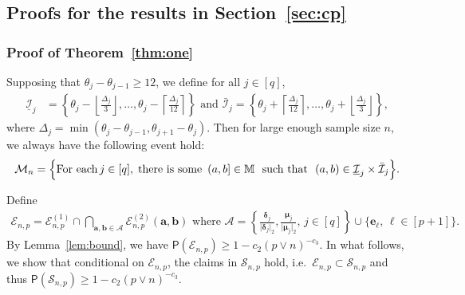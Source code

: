 \documentclass[11pt, a4paper]{article}
\newcommand{\mbf}{\mathbf}
\newcommand{\mc}{\mathcal}
\renewcommand{\l}{\left}
\renewcommand{\r}{\right}
\newcommand{\cp}{\theta}
\newcommand{\p}{\mathsf{P}}
\theoremstyle{definition}
\theoremstyle{definition}
\theoremstyle{definition}
\theoremstyle{definition}
\theoremstyle{definition}
\theoremstyle{remark}
\theoremstyle{definition}
\theoremstyle{definition}
\theoremstyle{definition}
\begin{document}
\subsection{Proofs for the results in Section~\ref{sec:cp}}

\subsubsection{Proof of Theorem~\ref{thm:one}}
\label{sec:pf:thm:one}

Supposing that $\cp_j - \cp_{j - 1} \ge 12$, we define for all $j \in [q]$,
\begin{align*}
\underline{\mc I}_j &= \l\{ \cp_j - \l\lfloor \frac{\Delta_j}{3} \r\rfloor, \ldots,  \cp_j - \l\lceil \frac{\Delta_j}{12} \r\rceil \r\} \text{ \ and \ } 
\bar{\mc I}_j = \l\{ \cp_j + \l\lceil \frac{\Delta_j}{12} \r\rceil, \ldots,   \cp_j + \l\lfloor \frac{\Delta_j}{3} \r\rfloor \r\},
\end{align*}
where $\Delta_j = \min(\cp_j - \cp_{j - 1}, \cp_{j + 1} - \cp_j)$.
Then for large enough sample size $n$, we always have the following event hold: 
\begin{align}
\label{eq:cond:M}
\mc M_n = \Bigl\{\text{For each} \, j \in [q], \; \text{there is some } \, (a, b] \in \mathbb{M} \text{ \ such that \ } (a, b) \in \underline{\mc I}_j \times \bar{\mc I}_j \Bigr\}.
\end{align}

Define 
\begin{align}
\mc E_{n, p} = \mc E_{n, p}^{(1)} \cap \bigcap_{\mbf a, \mbf b \in \mc A} \mc E_{n, p}^{(2)}(\mbf a, \mbf b) \text{ \ where \ } \mc A = \l\{ \frac{\bm\delta_j} {\vert \bm\delta_j \vert_2}, \frac{\bm\mu_j}{\vert \bm\mu_j \vert_2}, \, j \in [q] \r\}  \cup \{ \mbf e_\ell, \, \ell \in [p + 1] \}.
\label{eq:set:e}
\end{align}
By Lemma~\ref{lem:bound}, we have $\p(\mc E_{n, p}) \ge 1 - c_2 (p \vee n)^{-c_3}$.
In what follows, we show that conditional on $\mc E_{n, p}$, the claims in $\mc S_{n, p}$ hold, i.e.\ $\mc E_{n, p} \subset \mc S_{n, p}$ and thus $\p(\mc S_{n, p}) \ge 1 - c_2 (p \vee n)^{-c_3}$.
\end{document}
